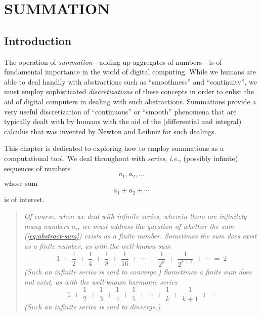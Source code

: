 
\chapter{SUMMATION}
\label{ch:Summation}


\section{Introduction}
\label{sec:intro}

The operation of {\it summation}---adding up aggregates of
numbers---is of fundamental importance in the world of digital
computing.  While we humans are able to deal handily with abstractions
such as ``smoothness'' and ``continuity'', we must employ
sophisticated {\em discretizations} of these concepts in order to
enlist the aid of digital computers in dealing with such abstractions.
Summations provide a very useful discretization of ``continuous'' or
``smooth'' phenomena that are typically dealt with by humans with the
aid of the (differential and integral) calculus that was invented by
Newton and Leibniz for such dealings.

This chapter is dedicated to exploring how to employ summations as a
computational tool.  We deal throughout with {\it series}, {\it i.e.},
(possibly infinite) sequences of numbers
\[ a_1, a_2, \ldots \]
whose sum
\begin{equation}
\label{eq:abstract-sum}
a_1 + a_2 + \cdots
\end{equation}
is of interest.
\begin{quote}
{\em Of course, when we deal with {\em infinite} series, wherein there
  are infinitely many numbers $a_i$, we must address the question of
  whether the sum (\ref{eq:abstract-sum}) exists as a finite number.
  Sometimes the sum does exist as a finite number, as with the
  well-known sum
\[ 1 \ + \ \frac{1}{2} \ + \ \frac{1}{4} \ + \ \frac{1}{8} \ +
\ \frac{1}{16} \ + \ \cdots \ + \ \frac{1}{2^k}  \ +
\ \frac{1}{2^{k+1}} \ + \ \cdots \ = \ 2 
\]
(Such an infinite series is said to {\em converge}.)
Sometimes a finite sum does {\em not} exist, as with the well-known
{\it harmonic} series
\[ 1 \ + \ \frac{1}{2} \ + \ \frac{1}{3} \ + \ \frac{1}{4} \ +
\ \frac{1}{5} \ + \ \cdots \ + \ \frac{1}{k}  \ + \ \frac{1}{k+1} \ +
\ \cdots
\]
(Such an infinite series is said to {\em dinverge}.)
}
\end{quote}


